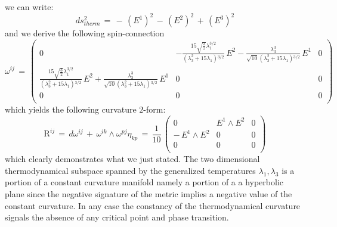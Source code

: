 \documentclass[10pt,a4paper]{article}
\newcommand{\ft}[2]{{\textstyle\frac{#1}{#2}}}
\begin{document}
we can write:
\begin{equation}\label{crollante}
   ds^2_{therm}\, = \, - \, (E^1)^2\,   - \, (E^2)^2\,   + \, (E^3)^2
\end{equation}
and we derive the following spin-connection
\begin{equation}\label{spinnoconno}
  \omega^{ij} \, = \,\left(
                       \begin{array}{ccc}
                         0 & -\frac{15 \sqrt{\frac{3}{2}} \lambda _1^{3/2}}{\left(\lambda _3^2+15 \lambda
   _1\right){}^{3/2}}\,E^2-\frac{\lambda _3^3}{\sqrt{10} \left(\lambda _3^2+15
   \lambda _1\right){}^{3/2}}\,E^1 & 0 \\
                         \frac{15 \sqrt{\frac{3}{2}} \lambda _1^{3/2}}{\left(\lambda _3^2+15 \lambda
   _1\right){}^{3/2}}\,E^2+\frac{\lambda _3^3}{\sqrt{10} \left(\lambda _3^2+15
   \lambda _1\right){}^{3/2}}\,E^1 & 0 & 0 \\
                         0 & 0 & 0 \\
                       \end{array}
                     \right)
\end{equation}
which yields the following curvature $2$-form:
\begin{equation}\label{krugavoi}
  \mathrm{R}^{ij} \, = \, d\omega^{ij} \, + \, \omega^{ik} \wedge \omega^{pj} \eta_{kp} \, = \,
  \ft {1}{10} \, \left(
    \begin{array}{ccc}
      0 & E^1 \wedge E^2 & 0 \\
     - \,  E^1 \wedge E^2 & 0 & 0 \\
      0 & 0 & 0 \\
    \end{array}
  \right)
\end{equation}
which clearly demonstrates what we just stated. The two dimensional thermodynamical subspace spanned by the generalized temperatures $\lambda_1,\lambda_3$ is a portion of a constant curvature manifold namely a portion of a
a hyperbolic plane since the negative signature of the metric implies a negative value of the constant curvature. In any case the constancy of the thermodynamical curvature  signals the absence of any critical point and phase transition.
\end{document}
